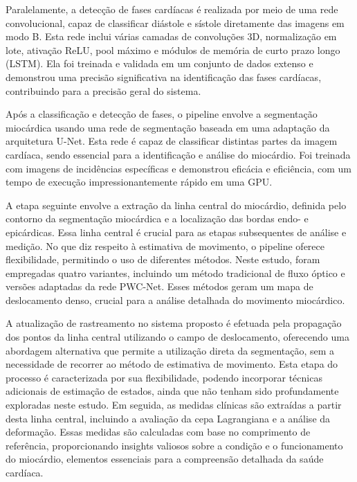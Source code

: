 Paralelamente, a detecção de fases cardíacas é realizada por meio de uma rede convolucional, capaz de classificar diástole e sístole diretamente das imagens em modo B. Esta rede inclui várias camadas de convoluções 3D, normalização em lote, ativação ReLU, pool máximo e módulos de memória de curto prazo longo (LSTM). Ela foi treinada e validada em um conjunto de dados extenso e demonstrou uma precisão significativa na identificação das fases cardíacas, contribuindo para a precisão geral do sistema.

Após a classificação e detecção de fases, o pipeline envolve a segmentação miocárdica usando uma rede de segmentação baseada em uma adaptação da arquitetura U-Net. Esta rede é capaz de classificar distintas partes da imagem cardíaca, sendo essencial para a identificação e análise do miocárdio. Foi treinada com imagens de incidências específicas e demonstrou eficácia e eficiência, com um tempo de execução impressionantemente rápido em uma GPU.

A etapa seguinte envolve a extração da linha central do miocárdio, definida pelo contorno da segmentação miocárdica e a localização das bordas endo- e epicárdicas. Essa linha central é crucial para as etapas subsequentes de análise e medição. No que diz respeito à estimativa de movimento, o pipeline oferece flexibilidade, permitindo o uso de diferentes métodos. Neste estudo, foram empregadas quatro variantes, incluindo um método tradicional de fluxo óptico e versões adaptadas da rede PWC-Net. Esses métodos geram um mapa de deslocamento denso, crucial para a análise detalhada do movimento miocárdico.

A atualização de rastreamento no sistema proposto é efetuada pela propagação dos pontos da linha central utilizando o campo de deslocamento, oferecendo uma abordagem alternativa que permite a utilização direta da segmentação, sem a necessidade de recorrer ao método de estimativa de movimento. Esta etapa do processo é caracterizada por sua flexibilidade, podendo incorporar técnicas adicionais de estimação de estados, ainda que não tenham sido profundamente exploradas neste estudo. Em seguida, as medidas clínicas são extraídas a partir desta linha central, incluindo a avaliação da cepa Lagrangiana e a análise da deformação. Essas medidas são calculadas com base no comprimento de referência, proporcionando insights valiosos sobre a condição e o funcionamento do miocárdio, elementos essenciais para a compreensão detalhada da saúde cardíaca.


